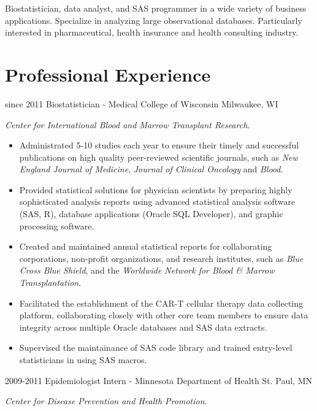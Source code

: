 Biostatistician, data analyst, and SAS programmer in a wide variety of business applications. Specialize in analyzing large observational databases. Particularly interested in pharmaceutical, health insurance and health consulting industry.\\

\section{Professional Experience}

\begin{entrylist}
  \entry
    {since 2011}
    {Biostatistician - Medical College of Wisconsin}
    {Milwaukee, WI}
    {
    \textit{Center for International Blood and Marrow Transplant Research}.
    \begin{itemize}
      \item Administrated 5-10 studies each year to ensure their timely and successful publications on high quality peer-reviewed scientific journals, such as \textit{New England Journal of Medicine}, \textit{Journal of Clinical Oncology} and \textit{Blood}.
      \item Provided statistical solutions for physician scientists by preparing highly sophisticated analysis reports using advanced statistical analysis software (SAS, R), database applications (Oracle SQL Developer), and graphic processing software.
      \item Created and maintained annual statistical reports for collaborating corporations, non-profit organizations, and research institutes, such as \textit{Blue Cross Blue Shield}, and the \textit{Worldwide Network for Blood \& Marrow Transplantation}.
      \item Facilitated the establishment of the CAR-T cellular therapy data collecting platform, collaborating closely with other core team members to ensure data integrity across multiple Oracle databases and SAS data extracts.
      \item Supervised the maintainance of SAS code library and trained entry-level statisticians in using SAS macros.
    \end{itemize}
    }
  \entry
    {2009-2011}
    {Epidemiologist Intern - Minnesota Department of Health}
    {St. Paul, MN}
    {
    \textit{Center for Disease Prevention and Health Promotion}.
    \begin{itemize}

\end{itemize}}
\end{entrylist}
